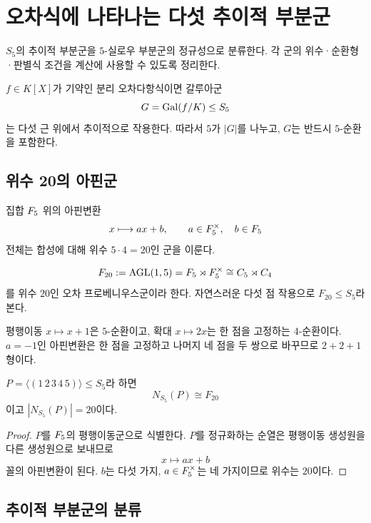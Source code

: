 \clearpage
\section{오차식에 나타나는 다섯 추이적 부분군}
\label{sec:transitive-quintic-subgroups}

\begin{learninggoal}
$S_5$의 추이적 부분군을 $5$-실로우 부분군의 정규성으로 분류한다. 각 군의 위수·순환형·판별식 조건을 계산에 사용할 수 있도록 정리한다.
\end{learninggoal}

$f\in K[X]$가 기약인 분리 오차다항식이면 갈루아군
\[
  G=\operatorname{Gal}(f/K)\le S_5
\]
는 다섯 근 위에서 추이적으로 작용한다. 따라서 $5$가 $|G|$를 나누고, $G$는 반드시 $5$-순환을 포함한다.

\subsection{위수 20의 아핀군}

집합 $F_5$ 위의 아핀변환
\[
  x\longmapsto ax+b,
  \qquad a\in F_5^\times,\quad b\in F_5
\]
전체는 합성에 대해 위수 $5\cdot4=20$인 군을 이룬다.

\begin{definition}[프로베니우스군 $F_{20}$]
\[
  F_{20}:=\operatorname{AGL}(1,5)
  =F_5\rtimes F_5^\times
  \cong C_5\rtimes C_4
\]
를 위수 $20$인 오차 프로베니우스군이라 한다. 자연스러운 다섯 점 작용으로 $F_{20}\le S_5$라 본다.
\end{definition}

평행이동 $x\mapsto x+1$은 $5$-순환이고, 확대 $x\mapsto2x$는 한 점을 고정하는 $4$-순환이다. $a=-1$인 아핀변환은 한 점을 고정하고 나머지 네 점을 두 쌍으로 바꾸므로 $2+2+1$형이다.

\begin{lemma}
\label{lem:normalizer-five-cycle}
$P=\langle(1\,2\,3\,4\,5)\rangle\le S_5$라 하면
\[
  N_{S_5}(P)\cong F_{20}
\]
이고 $|N_{S_5}(P)|=20$이다.
\end{lemma}

\begin{proof}
$P$를 $F_5$의 평행이동군으로 식별한다. $P$를 정규화하는 순열은 평행이동 생성원을 다른 생성원으로 보내므로
\[
  x\mapsto ax+b
\]
꼴의 아핀변환이 된다. $b$는 다섯 가지, $a\in F_5^\times$는 네 가지이므로 위수는 $20$이다.
\end{proof}

\subsection{추이적 부분군의 분류}

